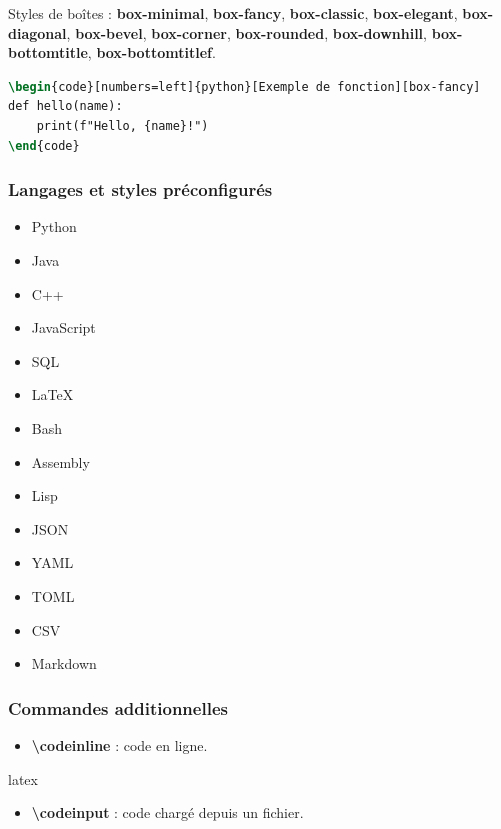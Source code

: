 \documentclass[
    french,
    margin=2cm
]{neoschool}
\begin{document}
Styles de boîtes : \textbf{box-minimal}, \textbf{box-fancy}, \textbf{box-classic}, \textbf{box-elegant}, \textbf{box-diagonal}, \textbf{box-bevel}, \textbf{box-corner}, \textbf{box-rounded}, \textbf{box-downhill}, \textbf{box-bottomtitle}, \textbf{box-bottomtitlef}.

\begin{lstlisting}[language=TeX]
\begin{code}[numbers=left]{python}[Exemple de fonction][box-fancy]
def hello(name):
    print(f"Hello, {name}!")
\end{code}
\end{lstlisting}

\subsubsection{Langages et styles préconfigurés}

\begin{itemize}
\item Python
\item Java
\item C++
\item JavaScript
\item SQL
\item LaTeX
\item Bash
\item Assembly
\item Lisp
\item JSON
\item YAML
\item TOML
\item CSV
\item Markdown
\end{itemize}

\subsubsection{Commandes additionnelles}

\begin{itemize}
\item \textbf{\textbackslash codeinline} : code en ligne.
\end{itemize}

\begin{code}{latex}
\end{code}

\begin{itemize}

\item \textbf{\textbackslash codeinput} : code chargé depuis un fichier.
\end{itemize}
\end{document}
